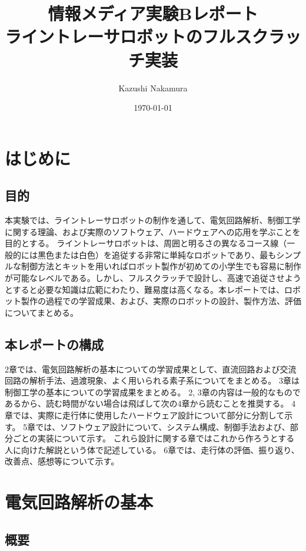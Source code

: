 \documentclass{ltjsreport}
\title{情報メディア実験Bレポート\\ライントレーサロボットのフルスクラッチ実装}
\author{Kazushi Nakamura}
\date{\today}
\begin{document}
\maketitle



\tableofcontents

\chapter{はじめに}


\section{目的}
本実験では、ライントレーサロボットの制作を通して、電気回路解析、制御工学に関する理論、および実際のソフトウェア、ハードウェアへの応用を学ぶことを目的とする。
ライントレーサロボットは、周囲と明るさの異なるコース線（一般的には黒色または白色）を追従する非常に単純なロボットであり、最もシンプルな制御方法とキットを用いればロボット製作が初めての小学生でも容易に制作が可能なレベルである。しかし、フルスクラッチで設計し、高速で追従させようとすると必要な知識は広範にわたり、難易度は高くなる。本レポートでは、ロボット製作の過程での学習成果、および、実際のロボットの設計、製作方法、評価についてまとめる。

\section{本レポートの構成}
2章では、電気回路解析の基本についての学習成果として、直流回路および交流回路の解析手法、過渡現象、よく用いられる素子系についてをまとめる。
3章は制御工学の基本についての学習成果をまとめる。
2, 3章の内容は一般的なものであるから、読む時間がない場合は飛ばして次の4章から読むことを推奨する。
4章では、実際に走行体に使用したハードウェア設計について部分に分割して示す。
5章では、ソフトウェア設計について、システム構成、制御手法および、部分ごとの実装について示す。
これら設計に関する章ではこれから作ろうとする人に向けた解説という体で記述している。
6章では、走行体の評価、振り返り、改善点、感想等について示す。

\chapter{電気回路解析の基本}
\section{概要}
\end{document}
